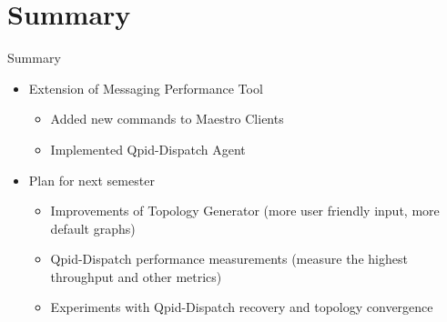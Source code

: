 \documentclass[hyperref={pdfpagelabels=false, unicode},pdf,slideColor,fyma,9pt]{beamer}
\begin{document}
		\section{Summary}
		\begin{frame}{Summary}
				\begin{itemize}
						\setlength\itemsep{0.5em}
						\item Extension of Messaging Performance Tool
						\vspace{0.5em}
						\begin{itemize}
							\setlength\itemsep{0.5em}
							\item Added new commands to Maestro Clients
							\item Implemented Qpid-Dispatch Agent
						\end{itemize}
						\item Plan for next semester
						\vspace{0.5em}
						\begin{itemize}
							\setlength\itemsep{0.5em}
							\item Improvements of Topology Generator (more user friendly input, more default graphs)
							\item Qpid-Dispatch performance measurements (measure the highest throughput and other metrics)
							\item Experiments with Qpid-Dispatch recovery and topology convergence
						\end{itemize}
				\end{itemize}
		\end{frame}
\end{document}
